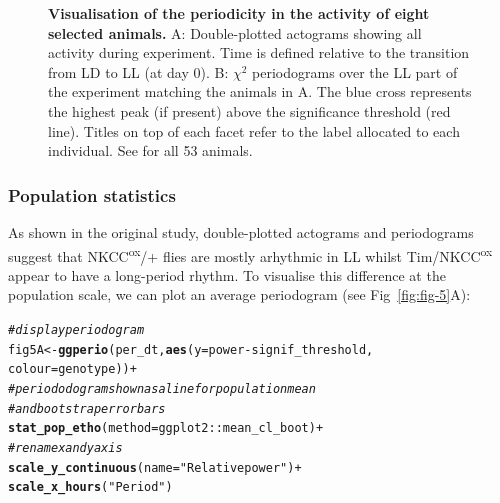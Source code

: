 \documentclass[10pt,letterpaper]{article}\usepackage[]{graphicx}\usepackage[]{color}
\makeatletter
\newcommand{\hlstr}[1]{\textcolor[rgb]{0.192,0.494,0.8}{#1}}%
\newcommand{\hlcom}[1]{\textcolor[rgb]{0.678,0.584,0.686}{\textit{#1}}}%
\newcommand{\hlopt}[1]{\textcolor[rgb]{0,0,0}{#1}}%
\newcommand{\hlstd}[1]{\textcolor[rgb]{0.345,0.345,0.345}{#1}}%
\newcommand{\hlkwb}[1]{\textcolor[rgb]{0.69,0.353,0.396}{#1}}%
\newcommand{\hlkwc}[1]{\textcolor[rgb]{0.333,0.667,0.333}{#1}}%
\newcommand{\hlkwd}[1]{\textcolor[rgb]{0.737,0.353,0.396}{\textbf{#1}}}%
\newenvironment{kframe}{%
 \def\at@end@of@kframe{}%
 \ifinner\ifhmode%
  \def\at@end@of@kframe{\end{minipage}}%
  \begin{minipage}{\columnwidth}%
 \fi\fi%
 \def\FrameCommand##1{\hskip\@totalleftmargin \hskip-\fboxsep
 \colorbox{shadecolor}{##1}\hskip-\fboxsep
     \hskip-\linewidth \hskip-\@totalleftmargin \hskip\columnwidth}%
 \MakeFramed {\advance\hsize-\width
   \@totalleftmargin\z@ \linewidth\hsize
   \@setminipage}}%
 {\par\unskip\endMakeFramed%
 \at@end@of@kframe}
\newenvironment{knitrout}{}{} %
\makeatother
\begin{document}
\begin{figure}[!h]
	\caption{{\bf Visualisation of the periodicity in the activity of eight selected animals.}
		A: Double-plotted actograms showing all activity during experiment.
		Time is defined relative to the transition from LD to LL (at day 0).
		B: $\chi{}^2$ periodograms over the LL part of the experiment matching the animals in A.
		The blue cross represents the highest peak (if present) above the significance threshold (red line).
		Titles on top of each facet refer to the label allocated to each individual.
		See  for all 53 animals.
	}
	\label{fig:fig-4}
\end{figure}

\subsubsection*{Population statistics}

As shown in the original study\cite{buhl_quasimodo_2016}, double-plotted actograms and periodograms suggest that NKCC\textsuperscript{ox}/+ flies are mostly 
arhythmic in LL whilst Tim/NKCC\textsuperscript{ox} appear to have a long-period rhythm.
To visualise this difference at the population scale, we can plot an average periodogram (see Fig~\ref{fig:fig-5}A):

\begin{knitrout}
\color{fgcolor}\begin{kframe}
\begin{alltt}
\hlcom{# display periodogram }
\hlstd{fig5A} \hlkwb{<-} \hlkwd{ggperio}\hlstd{(per_dt,} \hlkwd{aes}\hlstd{(}\hlkwc{y} \hlstd{= power} \hlopt{-} \hlstd{signif_threshold,}
                             \hlkwc{colour} \hlstd{= genotype))} \hlopt{+}
          \hlcom{# periododogram shown as a line for population mean}
          \hlcom{# and bootstrap error bars}
          \hlkwd{stat_pop_etho}\hlstd{(}\hlkwc{method} \hlstd{= ggplot2}\hlopt{::}\hlstd{mean_cl_boot)} \hlopt{+}
          \hlcom{# rename x and y axis }
          \hlkwd{scale_y_continuous}\hlstd{(}\hlkwc{name} \hlstd{=} \hlstr{"Relative power"}\hlstd{)} \hlopt{+}
          \hlkwd{scale_x_hours}\hlstd{(}\hlstr{"Period"}\hlstd{)}
\end{alltt}
\end{kframe}
\end{knitrout}
\end{document}

